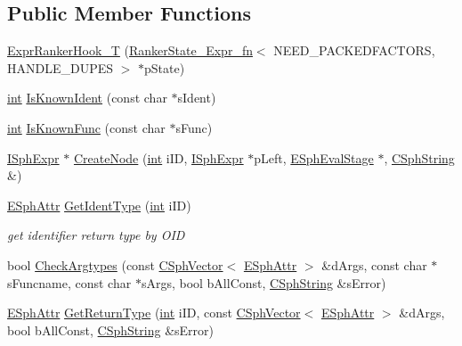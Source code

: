 \subsection*{Public Member Functions}
\begin{DoxyCompactItemize}
\item 
\hyperlink{classExprRankerHook__T_a94315360454c106ab1139d08efaacc07}{Expr\-Ranker\-Hook\-\_\-\-T} (\hyperlink{structRankerState__Expr__fn}{Ranker\-State\-\_\-\-Expr\-\_\-fn}$<$ N\-E\-E\-D\-\_\-\-P\-A\-C\-K\-E\-D\-F\-A\-C\-T\-O\-R\-S, H\-A\-N\-D\-L\-E\-\_\-\-D\-U\-P\-E\-S $>$ $\ast$p\-State)
\item 
\hyperlink{sphinxexpr_8cpp_a4a26e8f9cb8b736e0c4cbf4d16de985e}{int} \hyperlink{classExprRankerHook__T_ab1dfc7000bf0c65dbef1228719d082a6}{Is\-Known\-Ident} (const char $\ast$s\-Ident)
\item 
\hyperlink{sphinxexpr_8cpp_a4a26e8f9cb8b736e0c4cbf4d16de985e}{int} \hyperlink{classExprRankerHook__T_a2ee45cfc145af95b6f9281805f63a874}{Is\-Known\-Func} (const char $\ast$s\-Func)
\item 
\hyperlink{structISphExpr}{I\-Sph\-Expr} $\ast$ \hyperlink{classExprRankerHook__T_a43eeceaa2e633a31452786db6ead3497}{Create\-Node} (\hyperlink{sphinxexpr_8cpp_a4a26e8f9cb8b736e0c4cbf4d16de985e}{int} i\-I\-D, \hyperlink{structISphExpr}{I\-Sph\-Expr} $\ast$p\-Left, \hyperlink{sphinxexpr_8h_ae5eb5e13e926842882703cd0bd53ee46}{E\-Sph\-Eval\-Stage} $\ast$, \hyperlink{structCSphString}{C\-Sph\-String} \&)
\item 
\hyperlink{sphinxexpr_8h_aa883df0db2e4468a107fdd2d2ae625a3}{E\-Sph\-Attr} \hyperlink{classExprRankerHook__T_aa03e7869b1ec90b3036eab9d1b8759b7}{Get\-Ident\-Type} (\hyperlink{sphinxexpr_8cpp_a4a26e8f9cb8b736e0c4cbf4d16de985e}{int} i\-I\-D)
\begin{DoxyCompactList}\small\item\em get identifier return type by O\-I\-D \end{DoxyCompactList}\item 
bool \hyperlink{classExprRankerHook__T_aae53a92139b17847551ddc8a08e72119}{Check\-Argtypes} (const \hyperlink{classCSphVector}{C\-Sph\-Vector}$<$ \hyperlink{sphinxexpr_8h_aa883df0db2e4468a107fdd2d2ae625a3}{E\-Sph\-Attr} $>$ \&d\-Args, const char $\ast$s\-Funcname, const char $\ast$s\-Args, bool b\-All\-Const, \hyperlink{structCSphString}{C\-Sph\-String} \&s\-Error)
\item 
\hyperlink{sphinxexpr_8h_aa883df0db2e4468a107fdd2d2ae625a3}{E\-Sph\-Attr} \hyperlink{classExprRankerHook__T_a8c37a1d255ae37b126b08a4d18a49a3e}{Get\-Return\-Type} (\hyperlink{sphinxexpr_8cpp_a4a26e8f9cb8b736e0c4cbf4d16de985e}{int} i\-I\-D, const \hyperlink{classCSphVector}{C\-Sph\-Vector}$<$ \hyperlink{sphinxexpr_8h_aa883df0db2e4468a107fdd2d2ae625a3}{E\-Sph\-Attr} $>$ \&d\-Args, bool b\-All\-Const, \hyperlink{structCSphString}{C\-Sph\-String} \&s\-Error)

\end{DoxyCompactItemize}
